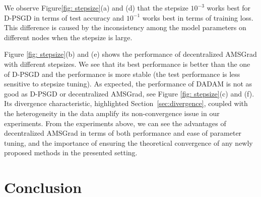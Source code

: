 \documentclass[11pt]{article}
\begin{document}
  
We observe Figure\ref{fig: stepsize}(a) and (d) that the stepsize $10^{-3}$ works best for D-PSGD in terms of test accuracy and $10^{-1}$ works best in terms of training loss. 
This difference is caused by the inconsistency among the model parameters on different nodes when the stepsize is large. 




%
  
Figure \ref{fig: stepsize}(b) and (e) shows the performance of decentralized AMSGrad with different stepsizes.
We see that its best performance is better than the one of D-PSGD and the performance is more stable (the test performance is less sensitive to stepsize tuning).
As expected, the performance of DADAM is not as good as D-PSGD or decentralized AMSGrad, see Figure \ref{fig: stepsize}(c) and (f).
Its divergence characteristic, highlighted Section~\ref{sec:divergence}, coupled with the heterogeneity in the data amplify its non-convergence issue in our experiments.  
From the experiments above, we can see the advantages of decentralized AMSGrad in terms of both performance and ease of parameter tuning, and the importance of ensuring the theoretical convergence of any newly proposed methods in the presented setting. 


\section{Conclusion}\label{sec:conclusion}
\end{document}
